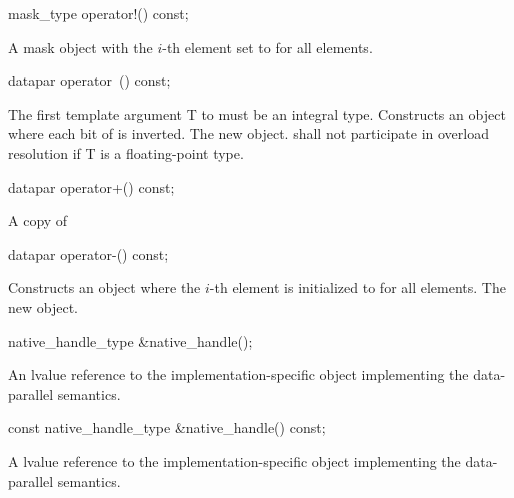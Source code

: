 \begin{wgText}
  \begin{itemdecl}
mask_type operator!() const;
  \end{itemdecl}
  \begin{itemdescr}
    \pnum\returns A mask object with the $i$-th element set to  for all elements.
  \end{itemdescr}

  \begin{itemdecl}
datapar operator~() const;
  \end{itemdecl}
  \begin{itemdescr}
    \pnum\requires The first template argument \type T to \datapar must be an integral type.
    \pnum\effects Constructs an object where each bit of  is inverted.
    \pnum\returns The new object.
    \pnum\remarks \datapar{} shall not participate in overload resolution if \type T is a floating-point type.
  \end{itemdescr}

  \begin{itemdecl}
datapar operator+() const;
  \end{itemdecl}
  \begin{itemdescr}
    \pnum \returns A copy of 
  \end{itemdescr}

  \begin{itemdecl}
datapar operator-() const;
  \end{itemdecl}
  \begin{itemdescr}
    \pnum\effects Constructs an object where the $i$-th element is initialized to  for all elements.
    \pnum\returns The new object.
  \end{itemdescr}

  \begin{itemdecl}
native_handle_type &native_handle();
  \end{itemdecl}
  \begin{itemdescr}
    \pnum\returns An lvalue reference to the implementation-specific object implementing the data-parallel semantics.
  \end{itemdescr}

  \begin{itemdecl}
const native_handle_type &native_handle() const;
  \end{itemdecl}
  \begin{itemdescr}
    \pnum\returns A \const lvalue reference to the implementation-specific object implementing the data-parallel semantics.
  \end{itemdescr}

  

\end{wgText}
